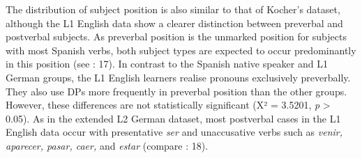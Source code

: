 \documentclass[
  letterpaper,
  DIV=11,
  numbers=noendperiod]{scrartcl}
\begin{document}
The distribution of subject position is also similar to that of Kocher's
dataset, although the L1 English data show a clearer distinction between
preverbal and postverbal subjects. As preverbal position is the unmarked
position for subjects with most Spanish verbs, both subject types are
expected to occur predominantly in this position (see
: 17). In contrast to the
Spanish native speaker and L1 German groups, the L1 English learners
realise pronouns exclusively preverbally. They also use DPs more
frequently in preverbal position than the other groups. However, these
differences are not statistically significant (X² = 3.5201, \emph{p}
\textgreater{} 0.05). As in the extended L2 German dataset, most
postverbal cases in the L1 English data occur with presentative
\emph{ser} and unaccusative verbs such as \emph{venir, aparecer, pasar,
caer,} and \emph{estar} (compare
: 18).
\end{document}
